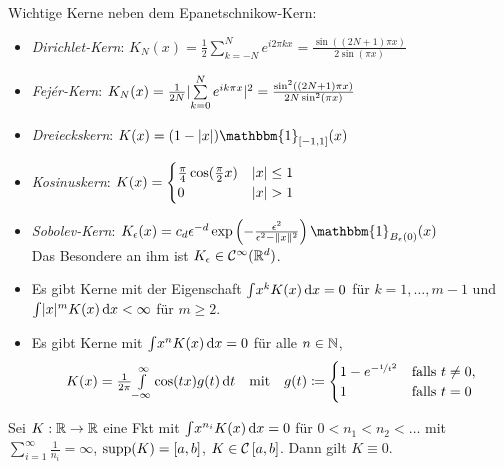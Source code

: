 \documentclass{cheat-sheet}
\newcommand{\ind}{\mathbbm{1}} %
\newcommand{\Cont}{\mathcal{C}} %
\begin{document}
\begin{bem}
  Wichtige Kerne neben dem Epanetschnikow-Kern:
  \begin{itemize}
    \item \emph{Dirichlet-Kern}: \enspace $K_N(x) = \tfrac{1}{2} \sum_{k=-N}^N e^{i 2 \pi k x} = \tfrac{\sin((2 N + 1) \pi x)}{2 \sin (\pi x)}$ %
    \item \emph{Fejér-Kern}: \enspace $K_N(x) = \tfrac{1}{2 N} \abs{\sum_{k=0}^N e^{i k \pi x}}^2 = \tfrac{\sin^2((2 N + 1) \pi x)}{2 N \sin^2(\pi x)}$ %
    \item \emph{Dreieckskern}: \enspace $K(x) = (1 - \abs{x}) \ind_{\cinterval{-1}{1}}(x)$
    \item \emph{Kosinuskern}: \enspace $K(x) = \begin{cases}
      \tfrac{\pi}{4} \cos(\tfrac{\pi}{2} x) & \lvert x\rvert \leq 1 \\
      0 & \lvert x\rvert > 1
    \end{cases}$
    \item \emph{Sobolev-Kern}: \enspace $K_\epsilon(x) = c_d \epsilon^{-d} \exp \left( - \tfrac{\epsilon^2}{\epsilon^2 - \norm{x}^2} \right) \ind_{B_\epsilon(0)}(x)$ \\
    Das Besondere an ihm ist $K_\epsilon \in \Cont^\infty(\R^d)$.
  \end{itemize}
\end{bem}

\begin{bemn}
  \begin{itemize}
    \item Es gibt Kerne mit der Eigenschaft ${\textstyle \int} x^k K(x) \,\mathrm{d} x = 0$ für $k = 1, \ldots, m - 1$ und ${\textstyle \int} \lvert x\rvert^m K(x) \,\mathrm{d} x < \infty$ für $m \geq 2$.
    \item Es gibt Kerne mit ${\textstyle \int} x^n K(x) \,\mathrm{d} x = 0$ für alle $n \in \mathbb{N}$, \zB{}
    \[
      K(x) = \tfrac{1}{2 \pi} {\textstyle \int\limits_{- \infty}^{\infty}} \cos(t x) g(t) \,\mathrm{d} t
      \quad \text{mit} \quad
      g(t) \coloneqq \begin{cases}
        1 - e^{- \nicefrac{1}{t^2}} & \text{falls } t \neq 0, \\
        1 & \text{falls } t = 0
      \end{cases}
    \]
  \end{itemize}
\end{bemn}

\begin{satz}[H. Müntz]
  Sei $K : \mathbb{R} \to \mathbb{R}$ eine Fkt mit ${\textstyle \int} x^{n_i} K(x) \,\mathrm{d} x = 0$ für $0 < n_1 < n_2 < \ldots$ mit ${\sum}_{i=1}^\infty \tfrac{1}{n_i} = \infty$, $\operatorname{supp}(K) = \left[ a, b \right]$, $K \in \Cont \cinterval{a}{b}$. Dann gilt $K \equiv 0$.
\end{satz}
\end{document}
